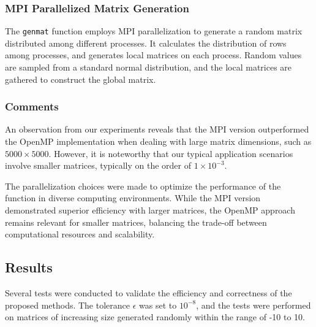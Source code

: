 \documentclass{article}
\begin{document}
\subsubsection*{MPI Parallelized Matrix Generation}

The \texttt{genmat} function employs MPI parallelization to generate a random matrix distributed among different processes. It calculates the distribution of rows among processes, and generates local matrices on each process. Random values are sampled from a standard normal distribution, and the local matrices are gathered to construct the global matrix.


\subsubsection*{Comments}

An observation from our experiments reveals that the MPI version outperformed the OpenMP implementation when dealing with large matrix dimensions, such as $5000 \times 5000$. However, it is noteworthy that our typical application scenarios involve smaller matrices, typically on the order of $1 \times 10^{-3}$.

The parallelization choices were made to optimize the performance of the function in diverse computing environments. While the MPI version demonstrated superior efficiency with larger matrices, the OpenMP approach remains relevant for smaller matrices, balancing the trade-off between computational resources and scalability.


\subsection{Results}
Several tests were conducted to validate the efficiency and correctness of the proposed methods. The tolerance \(\epsilon\) was set to \(10^{-8}\), and the tests were performed on matrices of increasing size generated randomly within the range of -10 to 10.
\end{document}

